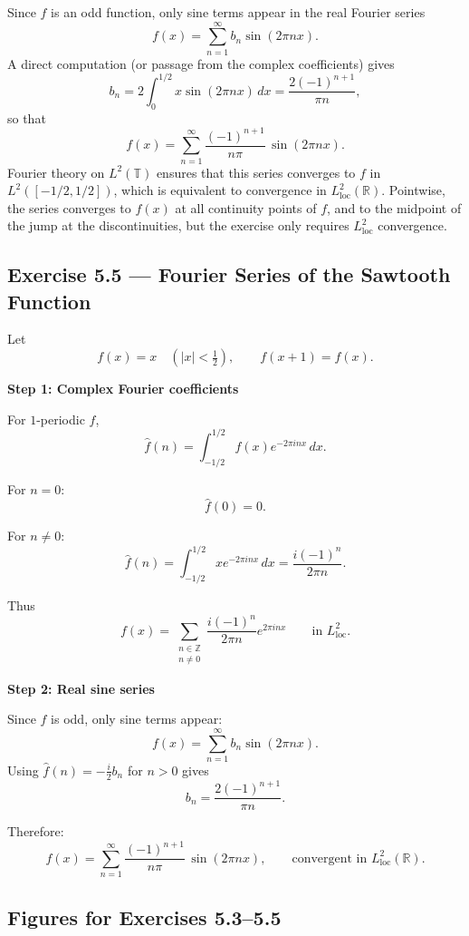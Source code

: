 \documentclass[12pt,a4paper]{article}
\theoremstyle{plain}
\theoremstyle{definition}
\theoremstyle{remark}
\theoremstyle{remark}
\begin{document}
Since $f$ is an odd function, only sine terms appear in the real Fourier
series
\[
f(x) = \sum_{n=1}^\infty b_n \sin(2\pi n x).
\]
A direct computation (or passage from the complex coefficients) gives
\[
b_n = 2\int_0^{1/2} x\sin(2\pi n x)\,dx
= \frac{2(-1)^{n+1}}{\pi n},
\]
so that
\[
f(x) = \sum_{n=1}^\infty \frac{(-1)^{n+1}}{n\pi}\,\sin(2\pi n x).
\]
Fourier theory on $L^2(\mathbb{T})$ ensures that this series converges
to $f$ in $L^2([-1/2,1/2])$, which is equivalent to convergence in
$L^2_{\mathrm{loc}}(\mathbb{R})$.  Pointwise, the series converges to
$f(x)$ at all continuity points of $f$, and to the midpoint of the jump
at the discontinuities, but the exercise only requires $L^2_{\mathrm{loc}}$
convergence.



\subsection*{Exercise 5.5 — Fourier Series of the Sawtooth Function}

Let
\[
f(x) = x \quad (|x|<\tfrac12),
\qquad f(x+1)=f(x).
\]

\bigskip
\noindent\textbf{Step 1: Complex Fourier coefficients}

For $1$-periodic $f$,
\[
\widehat f(n)
= \int_{-1/2}^{1/2} f(x)e^{-2\pi i n x}\,dx.
\]

For $n=0$:
\[
\widehat f(0)=0.
\]

For $n\neq 0$:
\[
\widehat f(n)
= \int_{-1/2}^{1/2} x e^{-2\pi i n x}\,dx
= \frac{i(-1)^n}{2\pi n}.
\]

Thus
\[
f(x)=\sum_{\substack{n\in\mathbb{Z}\\ n\ne 0}}
\frac{i(-1)^n}{2\pi n} e^{2\pi i n x}
\qquad\text{in } L^2_{\mathrm{loc}}.
\]

\bigskip
\noindent\textbf{Step 2: Real sine series}

Since $f$ is odd, only sine terms appear:
\[
f(x) = \sum_{n=1}^{\infty} b_n \sin(2\pi n x).
\]
Using $\widehat f(n)= -\frac{i}{2}b_n$ for $n>0$ gives
\[
b_n = \frac{2(-1)^{n+1}}{\pi n}.
\]

Therefore:
\[
f(x)
= \sum_{n=1}^{\infty}
\frac{(-1)^{n+1}}{n\pi}\,\sin(2\pi n x),
\qquad
\text{convergent in } L^2_{\mathrm{loc}}(\mathbb{R}).
\]

\clearpage

\subsection*{Figures for Exercises 5.3–5.5}
\end{document}
